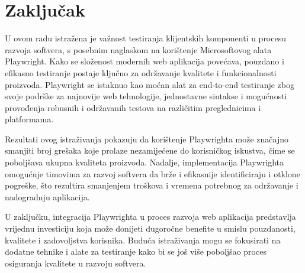 \chapter{Zaključak}\label{ch:Zakljucak}
U ovom radu istražena je važnost testiranja klijentskih komponenti u procesu razvoja softvera, s posebnim naglaskom na korištenje Microsoftovog alata Playwright. 
Kako se složenost modernih web aplikacija povećava, pouzdano i efikasno testiranje postaje ključno za održavanje kvalitete i funkcionalnosti proizvoda. 
Playwright se istaknuo kao moćan alat za end-to-end testiranje zbog svoje podrške za najnovije web tehnologije, jednostavne sintakse i mogućnosti provođenja robusnih i održavanih testova na različitim preglednicima i platformama.

Rezultati ovog istraživanja pokazuju da korištenje Playwrighta može značajno smanjiti broj grešaka koje prolaze nezamijećene do korisničkog iskustva, čime se poboljšava ukupna kvaliteta proizvoda. 
Nadalje, implementacija Playwrighta omogućuje timovima za razvoj softvera da brže i efikasnije identificiraju i otklone pogreške, što rezultira smanjenjem troškova i vremena potrebnog za održavanje i nadogradnju aplikacija.

U zaključku, integracija Playwrighta u proces razvoja web aplikacija predstavlja vrijednu investiciju koja može donijeti dugoročne benefite u smislu pouzdanosti, kvalitete i zadovoljstva korisnika.
Buduća istraživanja mogu se fokusirati na dodatne tehnike i alate za testiranje kako bi se još više poboljšao proces osiguranja kvalitete u razvoju softvera.